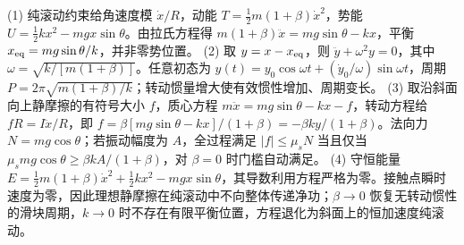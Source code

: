 (1) 纯滚动约束给角速度模 \(\dot x/R\)，动能 \(T=\frac12m(1+\beta)\dot x^2\)，势能 \(U=\frac12kx^2-mgx\sin\theta\)。由拉氏方程得 \(m(1+\beta)\ddot x=mg\sin\theta-kx\)，平衡 \(x_{\rm eq}=mg\sin\theta/k\)，并非零势位置。
(2) 取 \(y=x-x_{\rm eq}\)，则 \(\ddot y+\omega^2y=0\)，其中 \(\omega=\sqrt{k/[m(1+\beta)]}\)。任意初态为 \(y(t)=y_0\cos\omega t+(\dot y_0/\omega)\sin\omega t\)，周期 \(P=2\pi\sqrt{m(1+\beta)/k}\)；转动惯量增大使有效惯性增加、周期变长。
(3) 取沿斜面向上静摩擦的有符号大小 \(f\)，质心方程 \(m\ddot x=mg\sin\theta-kx-f\)，转动方程给 \(fR=I\ddot x/R\)，即 \(f=\beta[mg\sin\theta-kx]/(1+\beta)=-\beta ky/(1+\beta)\)。法向力 \(N=mg\cos\theta\)；若振动幅度为 \(A\)，全过程满足 \(|f|\le\mu_sN\) 当且仅当 \(\mu_s mg\cos\theta\ge\beta kA/(1+\beta)\)，对 \(\beta=0\) 时门槛自动满足。
(4) 守恒能量 \(E=\frac12m(1+\beta)\dot x^2+\frac12kx^2-mgx\sin\theta\)，其导数利用方程严格为零。接触点瞬时速度为零，因此理想静摩擦在纯滚动中不向整体传递净功；\(\beta\to0\) 恢复无转动惯性的滑块周期，\(k\to0\) 时不存在有限平衡位置，方程退化为斜面上的恒加速度纯滚动。
